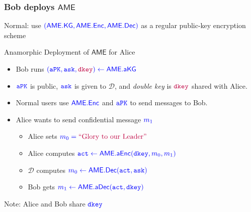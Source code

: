 \documentclass[]{beamer}
\newcommand{\from}{\leftarrow}
\newcommand{\calD}{\mathcal{D}}    %
\newcommand{\algofont}[1]{{\mathsf{#1}}}
\newcommand{\objfont}[1]{{\mathtt{#1}}}
\newcommand{\kg}{\algofont{KG}}
\newcommand{\enc}{\algofont{Enc}}
\newcommand{\dec}{\algofont{Dec}}
\newcommand{\akg}{\algofont{a}\kg}
\newcommand{\aenc}{\algofont{a}\enc}
\newcommand{\adec}{\algofont{a}\dec}
\newcommand{\constr}{\algofont{AME}}
\newcommand{\ct}{\objfont{ct}}      %
\newcommand{\pk}{\objfont{PK}}      %
\newcommand{\sk}{\objfont{sk}}      %
\newcommand{\apk}{\objfont{a}\pk}   %
\newcommand{\ask}{\objfont{a}\sk}   %
\newcommand{\act}{\objfont{a}\ct}   %
\newcommand{\dkey}{\objfont{dkey}}  %
\begin{document}
\begin{frame}
\frametitle{Bob deploys $\constr$} 

{\color{blue} Normal:}
use $\color{blue} (\constr.\kg,\constr.\enc,\constr.\dec)$ as a
regular public-key encryption scheme

\begin{block}{Anamorphic Deployment of $\constr$ for Alice} 

    \begin{itemize}
        \item Bob runs $\color{blue} (\apk,\ask,{\color{purple} \dkey})\from\constr.\akg$ 
    \item $\color{blue} \apk$ is public, $\color{blue} \ask$ is given to $\calD$, and {\em\color{brown} double key} is
            $\color{purple} \dkey$ shared with Alice.
    \item Normal users use $\color{blue}\constr.\enc$ and $\color{blue} \apk$ to send messages to Bob.
    \item Alice wants to send confidential message $\color{blue}m_1$
        \begin{itemize}
        \item Alice sets $\color{blue}m_0=\color{purple}
        \text{``Glory to our Leader''}$
        \item Alice computes $\color{blue} \act\from\constr.\aenc(\dkey,m_0,m_1)$
        \item $\calD$ computes $\color{blue} m_0\from\constr.\dec(\act,\ask)$ 
        \item Bob gets $\color{blue} m_1\from\constr.\adec(\act,\dkey)$
        \end{itemize}
\end{itemize}
\end{block}

\vfill

{\color{red} Note:} {\color{brown} Alice and Bob share $\color{blue}\dkey$}
\end{frame}
\end{document}
